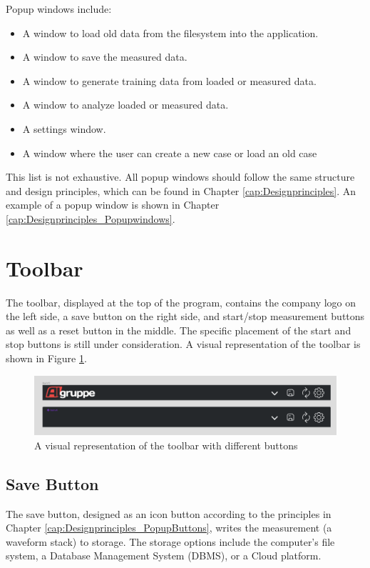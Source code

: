 \documentclass[]{scrreprt}
\begin{document}
Popup windows include:
\begin{itemize}
\item A window to load old data from the filesystem into the application.
\item A window to save the measured data.
\item A window to generate training data from loaded or measured data.
\item A window to analyze loaded or measured data.
\item A settings window.
\item A window where the user can create a new case or load an old case
\end{itemize}
This list is not exhaustive.
 All popup windows should follow the same structure and design principles, which can be found in Chapter \ref{cap:Designprinciples}.
 An example of a popup window is shown in Chapter \ref{cap:Designprinciples_Popupwindows}.


\section{Toolbar}


The toolbar, displayed at the top of the program, contains the company logo on the left side,
a save button on the right side, and start/stop measurement buttons as well as a reset button in the middle.
The specific placement of the start and stop buttons is still under consideration. A visual representation of the toolbar is shown in Figure \ref{fig:toolbar}.


\begin{figure}
\includegraphics[width=.9\textwidth]{assets/pictures/Toolbar states.png}
\caption[]{A visual representation of the toolbar with different buttons}
\label{fig:toolbar}
\end{figure}


\subsection{Save Button}
The save button, designed as an icon button according to the principles in Chapter \ref{cap:Designprinciples_PopupButtons},
 writes the measurement (a waveform stack) to storage. The storage options include the computer's file system, a Database Management System (DBMS), or a Cloud platform.
\end{document}
